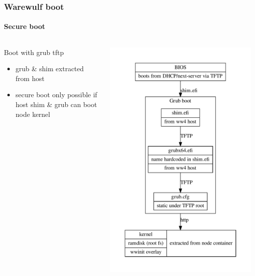 \documentclass[aspectratio=169]{beamer}
\begin{document}
\begin{frame}[fragile]
\frametitle{Warewulf boot}
\framesubtitle{Secure boot }
\begin{columns}
\begin{block}{Boot with grub tftp}
\begin{itemize}
  \item grub \& shim extracted from host
  \item secure boot only possible if host shim \& grub can boot node kernel
\end{itemize}
\end{block}
\includegraphics[width=.7\linewidth]{grub_ipxe}
\end{columns}
\end{frame}
\end{document}

